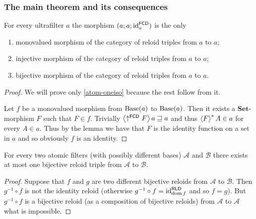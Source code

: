 \subsubsection{The main theorem and its consequences}
\begin{thm}
For every ultrafilter $a$ the morphism $(a;a;\operatorname{id}_{a}^{\mathsf{FCD}})$
is the only
\begin{enumerate}
\item \label{atom-oneiso}monovalued morphism of the category of reloid
triples from $a$ to $a$;
\item injective morphism of the category of reloid triples from $a$ to
$a$;
\item bijective morphism of the category of reloid triples from $a$ to
$a$.
\end{enumerate}
\end{thm}
\begin{proof}
We will prove only \ref{atom-oneiso} because the rest follow from
it.

Let $f$ be a monovalued morphism from $\operatorname{Base}(a)$ to $\operatorname{Base}(a)$.
Then it exists a $\mathbf{Set}$-morphism $F$ such that $F\in f$.
Trivially $\left\langle \uparrow^{\mathsf{FCD}}F\right\rangle a\sqsupseteq a$ and thus
$\left\langle F\right\rangle ^{\ast}A\in a$ for every $A\in a$. Thus by the lemma we have
that $F$ is the identity function on a set in $a$ and so obviously
$f$ is an identity.\end{proof}
\begin{cor}
For every two atomic filters (with possibly different bases) $\mathcal{A}$
and $\mathcal{B}$ there exists at most one bijective reloid triple
from $\mathcal{A}$ to $\mathcal{B}$.\end{cor}
\begin{proof}
Suppose that $f$ and $g$ are two different bijective reloids from
$\mathcal{A}$ to $\mathcal{B}$. Then $g^{-1}\circ f$ is not the
identity reloid (otherwise $g^{-1}\circ f=\operatorname{id}_{\operatorname{dom} f}^{\mathsf{RLD}}$
and so $f=g$). But $g^{-1}\circ f$ is a bijective reloid (as a composition
of bijective reloids) from $\mathcal{A}$ to $\mathcal{A}$ what is
impossible.
\end{proof}

